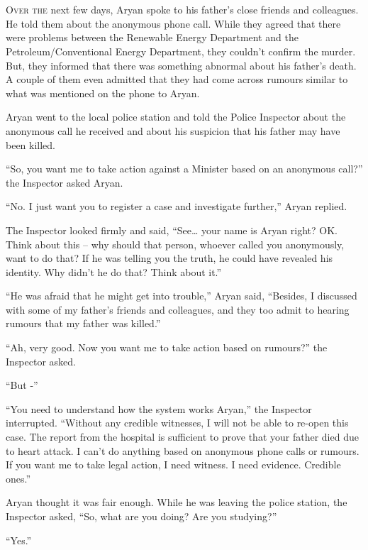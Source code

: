 \chapter{}

\lettrine{O}{ver the} next few days, Aryan spoke to his father's close friends and
colleagues. He told them about the anonymous phone call. While they agreed that
there were problems between the Renewable Energy Department and the
Petroleum/Conventional Energy Department, they couldn't confirm the murder. But,
they informed that there was something abnormal about his father's death. A
couple of them even admitted that they had come across rumours similar to what
was mentioned on the phone to Aryan.

Aryan went to the local police station and told the Police Inspector about the
anonymous call he received and about his suspicion that his father may have been
killed.

“So, you want me to take action against a Minister based on an anonymous call?”
the Inspector asked Aryan.

“No. I just want you to register a case and investigate further,” Aryan replied.

The Inspector looked firmly and said, “See… your name is Aryan right? OK.
Think about this – why should that person, whoever called you anonymously, want
to do that? If he was telling you the truth, he could have revealed his
identity. Why didn't he do that? Think about it.”

“He was afraid that he might get into trouble,” Aryan said, “Besides, I
discussed with some of my father's friends and colleagues, and they too admit to
hearing rumours that my father was killed.”

“Ah, very good. Now you want me to take action based on rumours?” the Inspector
asked.

“But -”

“You need to understand how the system works Aryan,” the Inspector interrupted.
“Without any credible witnesses, I will not be able to re-open this case. The
report from the hospital is sufficient to prove that your father died due to
heart attack. I can't do anything based on anonymous phone calls or rumours. If
you want me to take legal action, I need witness. I need evidence. Credible
ones.”

Aryan thought it was fair enough. While he was leaving the police station, the
Inspector asked, “So, what are you doing? Are you studying?”

“Yes.”

